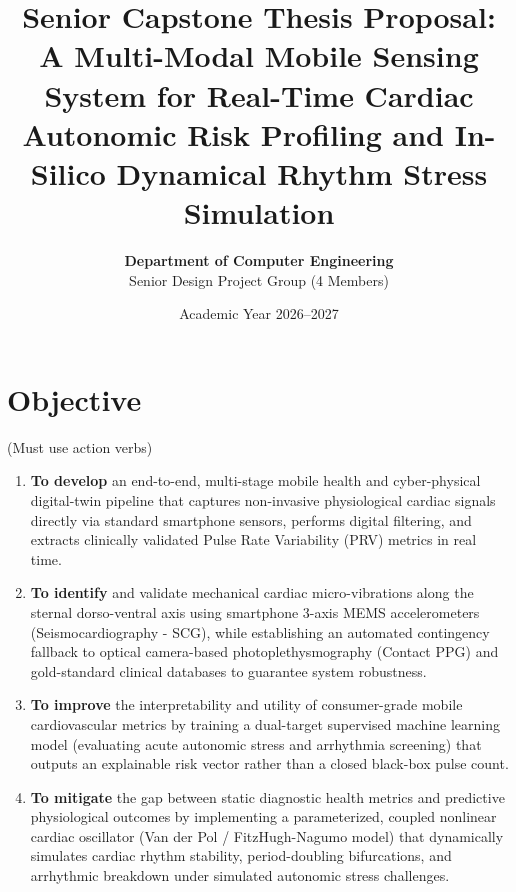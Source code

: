 \documentclass[11pt,a4paper]{article}
\title{\textbf{Senior Capstone Thesis Proposal:}\\
A Multi-Modal Mobile Sensing System for Real-Time Cardiac Autonomic Risk Profiling and In-Silico Dynamical Rhythm Stress Simulation}
\author{\textbf{Department of Computer Engineering} \\ 
Senior Design Project Group (4 Members)}
\date{Academic Year 2026--2027}
\begin{document}
\maketitle

\section{Objective}
\noindent\hspace{1.5em}(Must use action verbs)
\begin{enumerate}[leftmargin=2.5em]
    \item \textbf{To develop} an end-to-end, multi-stage mobile health and cyber-physical digital-twin pipeline that captures non-invasive physiological cardiac signals directly via standard smartphone sensors, performs digital filtering, and extracts clinically validated Pulse Rate Variability (PRV) metrics in real time.
    \item \textbf{To identify} and validate mechanical cardiac micro-vibrations along the sternal dorso-ventral axis using smartphone 3-axis MEMS accelerometers (Seismocardiography - SCG), while establishing an automated contingency fallback to optical camera-based photoplethysmography (Contact PPG) and gold-standard clinical databases to guarantee system robustness.
    \item \textbf{To improve} the interpretability and utility of consumer-grade mobile cardiovascular metrics by training a dual-target supervised machine learning model (evaluating acute autonomic stress and arrhythmia screening) that outputs an explainable risk vector rather than a closed black-box pulse count.
    \item \textbf{To mitigate} the gap between static diagnostic health metrics and predictive physiological outcomes by implementing a parameterized, coupled nonlinear cardiac oscillator (Van der Pol / FitzHugh-Nagumo model) that dynamically simulates cardiac rhythm stability, period-doubling bifurcations, and arrhythmic breakdown under simulated autonomic stress challenges.
\end{enumerate}
\end{document}
